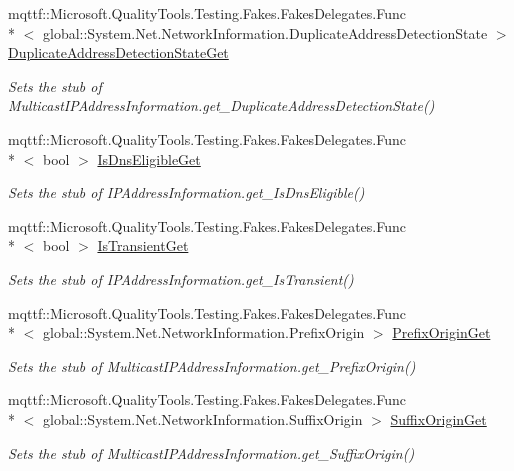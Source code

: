 \begin{DoxyCompactItemize}
mqttf\-::\-Microsoft.\-Quality\-Tools.\-Testing.\-Fakes.\-Fakes\-Delegates.\-Func\\*
$<$ global\-::\-System.\-Net.\-Network\-Information.\-Duplicate\-Address\-Detection\-State $>$ \hyperlink{class_system_1_1_net_1_1_network_information_1_1_fakes_1_1_stub_multicast_i_p_address_information_acc9622c5e5fac32148960259eaad26f5}{Duplicate\-Address\-Detection\-State\-Get}
\begin{DoxyCompactList}\small\item\em Sets the stub of Multicast\-I\-P\-Address\-Information.\-get\-\_\-\-Duplicate\-Address\-Detection\-State()\end{DoxyCompactList}\item 
mqttf\-::\-Microsoft.\-Quality\-Tools.\-Testing.\-Fakes.\-Fakes\-Delegates.\-Func\\*
$<$ bool $>$ \hyperlink{class_system_1_1_net_1_1_network_information_1_1_fakes_1_1_stub_multicast_i_p_address_information_a26e8dcf64f56c435514c7f6b836c2a93}{Is\-Dns\-Eligible\-Get}
\begin{DoxyCompactList}\small\item\em Sets the stub of I\-P\-Address\-Information.\-get\-\_\-\-Is\-Dns\-Eligible()\end{DoxyCompactList}\item 
mqttf\-::\-Microsoft.\-Quality\-Tools.\-Testing.\-Fakes.\-Fakes\-Delegates.\-Func\\*
$<$ bool $>$ \hyperlink{class_system_1_1_net_1_1_network_information_1_1_fakes_1_1_stub_multicast_i_p_address_information_a19669a4a746f4888c71ca2fb47b4e53f}{Is\-Transient\-Get}
\begin{DoxyCompactList}\small\item\em Sets the stub of I\-P\-Address\-Information.\-get\-\_\-\-Is\-Transient()\end{DoxyCompactList}\item 
mqttf\-::\-Microsoft.\-Quality\-Tools.\-Testing.\-Fakes.\-Fakes\-Delegates.\-Func\\*
$<$ global\-::\-System.\-Net.\-Network\-Information.\-Prefix\-Origin $>$ \hyperlink{class_system_1_1_net_1_1_network_information_1_1_fakes_1_1_stub_multicast_i_p_address_information_a425159652cdc15d3ef9cc56569812d5c}{Prefix\-Origin\-Get}
\begin{DoxyCompactList}\small\item\em Sets the stub of Multicast\-I\-P\-Address\-Information.\-get\-\_\-\-Prefix\-Origin()\end{DoxyCompactList}\item 
mqttf\-::\-Microsoft.\-Quality\-Tools.\-Testing.\-Fakes.\-Fakes\-Delegates.\-Func\\*
$<$ global\-::\-System.\-Net.\-Network\-Information.\-Suffix\-Origin $>$ \hyperlink{class_system_1_1_net_1_1_network_information_1_1_fakes_1_1_stub_multicast_i_p_address_information_a1d0c7639b38005a2b592f2842265cc9b}{Suffix\-Origin\-Get}
\begin{DoxyCompactList}\small\item\em Sets the stub of Multicast\-I\-P\-Address\-Information.\-get\-\_\-\-Suffix\-Origin()\end{DoxyCompactList}\end{DoxyCompactItemize}
